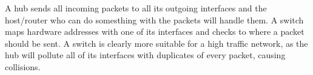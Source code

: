 A hub sends all incoming packets to all its outgoing interfaces and the host/router who can do somesthing with the packets will handle them.
A switch maps hardware addresses with one of its interfaces and checks to where a packet should be sent.
A switch is clearly more suitable for a high traffic network, as the hub will pollute all of its interfaces with duplicates of every packet, causing collisions.